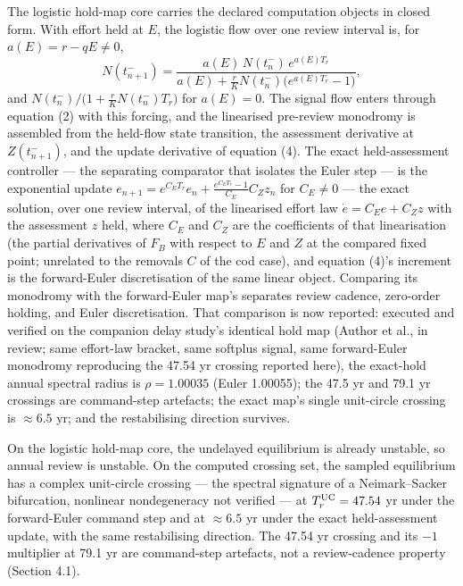 \documentclass[11pt]{article}
\begin{document}
The logistic hold-map core carries the declared computation objects in
closed form. With effort held at \(E\), the logistic flow over one
review interval is, for \(a(E) = r - qE \ne 0\),
\[N(t_{n+1}^-) = \frac{a(E)\,N(t_n^-)\,e^{a(E)T_r}}{a(E) + \tfrac{r}{K}N(t_n^-)\bigl(e^{a(E)T_r} - 1\bigr)},\]
and \(N(t_n^-)\big/\!\bigl(1 + \tfrac{r}{K}N(t_n^-)T_r\bigr)\) for
\(a(E) = 0\). The signal flow enters through equation (2) with this
forcing, and the linearised pre-review monodromy is assembled from the
held-flow state transition, the assessment derivative at
\(Z(t_{n+1}^-)\), and the update derivative of equation (4). The exact
held-assessment controller --- the separating comparator that isolates
the Euler step --- is the exponential update
\(e_{n+1} = e^{C_E T_r}e_n + \tfrac{e^{C_E T_r}-1}{C_E}C_Z z_n\) for
\(C_E \ne 0\) --- the exact solution, over one review interval, of the
linearised effort law \(\dot e = C_E e + C_Z z\) with the assessment
\(z\) held, where \(C_E\) and \(C_Z\) are the coefficients of that
linearisation (the partial derivatives of \(F_B\) with respect to \(E\)
and \(Z\) at the compared fixed point; unrelated to the removals \(C\)
of the cod case), and equation (4)'s increment is the forward-Euler
discretisation of the same linear object. Comparing its monodromy with
the forward-Euler map's separates review cadence, zero-order holding,
and Euler discretisation. That comparison is now reported: executed and
verified on the companion delay study's identical hold map (Author et
al., in review; same effort-law bracket, same softplus signal, same
forward-Euler monodromy reproducing the 47.54 yr crossing reported
here), the exact-hold annual spectral radius is \(\rho = 1.00035\)
(Euler 1.00055); the 47.5 yr and 79.1 yr crossings are command-step
artefacts; the exact map's single unit-circle crossing is
\(\approx 6.5\) yr; and the restabilising direction survives.

On the logistic hold-map core, the undelayed equilibrium is already
unstable, so annual review is unstable. On the computed crossing set,
the sampled equilibrium has a complex unit-circle crossing --- the
spectral signature of a Neimark--Sacker bifurcation, nonlinear
nondegeneracy not verified --- at \(T_r^{\rm UC}=47.54\) yr under the
forward-Euler command step and at \(\approx 6.5\) yr under the exact
held-assessment update, with the same restabilising direction. The 47.54
yr crossing and its \(-1\) multiplier at 79.1 yr are command-step
artefacts, not a review-cadence property (Section 4.1).
\end{document}
